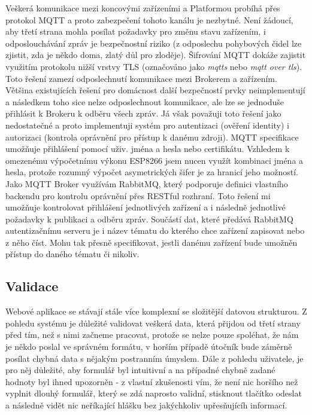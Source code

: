 Veškerá komunikace mezi koncovými zařízeními a Platformou probíhá přes protokol MQTT a proto zabezpečení tohoto kanálu je nezbytné. Není žádoucí, aby třetí strana mohla posílat požadavky pro změnu stavu zařízením, i odposlouchávání zpráv je bezpečnostní riziko (z odposlechu pohybových čidel lze zjistit, zda je někdo doma, zlatý důl pro zloděje). Šifrování MQTT dokáže zajistit využitím protokolu nižší vrstvy TLS (označováno jako \textit{mqtts} nebo \textit{mqtt over tls}). Toto řešení zamezí odposlechnutí komunikace mezi Brokerem a zařízením. Většina existujících řešení pro domácnost další bezpečností prvky neimplementují a následkem toho sice nelze odposlechnout komunikace, ale lze se jednoduše přihlásit k Brokeru k odběru všech zpráv. Já však považuji toto řešení jako nedostatečné a proto implementuji systém pro autentizaci (ověření identity) i autorizaci (kontrola oprávnění pro přístup k danému zdroji). MQTT specifikace umožňuje přihlášení pomocí uživ. jména a hesla nebo certifikátu. Vzhledem k omezenému výpočetnímu výkonu ESP8266 jsem nucen využít kombinaci jména a hesla, protože rozumný výpočet asymetrických šifer je za hranicí jeho možností. Jako MQTT Broker využívám RabbitMQ, který podporuje definici vlastního backendu pro kontrolu oprávnění přes RESTful rozhraní. Toto řešení mi umožňuje kontrolovat přihlášení jednotlivých zařízení a i následně jednotlivé požadavky k publikaci a odběru zpráv. Součástí dat, které předává RabbitMQ autentizačnímu serveru je i název tématu do kterého chce zařízení zapisovat nebo z něho číst. Mohu tak přesně specifikovat, jestli danému zařízení bude umožněn přístup do daného tématu či nikoliv.

\subsection{Validace}
\label{BE:Validace}
Webové aplikace se stávají stále více komplexní se složitější datovou strukturou. Z pohledu systému je důležité validovat veškerá data, která přijdou od třetí strany před tím, než s nimi začneme pracovat, protože se nelze pouze spoléhat, že nám je někdo poslal ve správném formátu, v horším případě útočník bude záměrně posílat chybná data s nějakým postranním úmyslem. Dále z pohledu uživatele, je pro něj důležité, aby formulář byl intuitivní a na případné chybně zadané hodnoty byl ihned upozorněn - z vlastní zkušenosti vím, že není nic horšího než vyplnit dlouhý formulář, který se zdá naprosto validní, stisknout tlačítko odeslat a následně vidět nic neříkající hlášku  bez jakýchkoliv upřesňujícíh informací.

